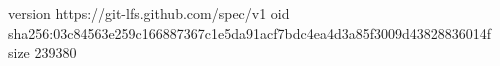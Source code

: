 version https://git-lfs.github.com/spec/v1
oid sha256:03c84563e259c166887367c1e5da91acf7bdc4ea4d3a85f3009d43828836014f
size 239380
